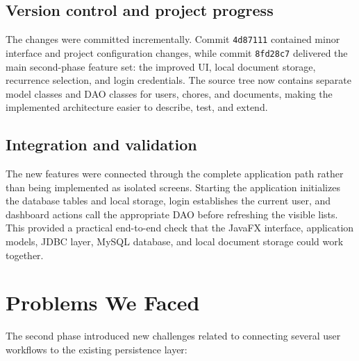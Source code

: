 \documentclass[11pt,a4paper]{article}
\begin{document}
\subsection{Version control and project progress}
The changes were committed incrementally. Commit \texttt{4d87111} contained minor interface and project configuration changes, while commit \texttt{8fd28c7} delivered the main second-phase feature set: the improved UI, local document storage, recurrence selection, and login credentials. The source tree now contains separate model classes and DAO classes for users, chores, and documents, making the implemented architecture easier to describe, test, and extend.

\subsection{Integration and validation}
The new features were connected through the complete application path rather than being implemented as isolated screens. Starting the application initializes the database tables and local storage, login establishes the current user, and dashboard actions call the appropriate DAO before refreshing the visible lists. This provided a practical end-to-end check that the JavaFX interface, application models, JDBC layer, MySQL database, and local document storage could work together.

\section{Problems We Faced}

The second phase introduced new challenges related to connecting several user workflows to the existing persistence layer:
\end{document}
